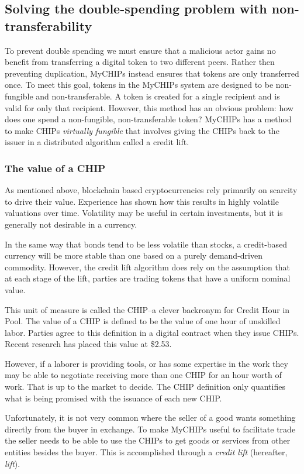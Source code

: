 \documentclass[runningheads]{llncs}
\begin{document}
\subsection{Solving the double-spending problem with non-transferability}
To prevent double spending we must ensure that a malicious actor gains no benefit from transferring a digital token to two different peers. Rather then preventing duplication, MyCHIPs instead ensures that tokens are only transferred once. To meet this goal, tokens in the MyCHIPs system are designed to be non-fungible and non-transferable. A token is created for a single recipient and is valid for only that recipient. However, this method has an obvious problem: how does one spend a non-fungible, non-transferable token? MyCHIPs has a method to make CHIPs \emph{virtually fungible} that involves giving the CHIPs back to the issuer in a distributed algorithm called a credit lift.  \cite{bateman_myCHIPs}


\subsubsection{The value of a CHIP}
As mentioned above, blockchain based cryptocurrencies rely primarily on scarcity to drive their value.
Experience has shown how this results in highly volatile valuations over time.
Volatility may be useful in certain investments, but it is generally not desirable in a currency.

In the same way that bonds tend to be less volatile than stocks, a credit-based currency will be more stable than one based on a purely demand-driven commodity.
However, the credit lift algorithm does rely on the assumption that at each stage of the lift, parties are trading tokens that have a uniform nominal value.

This unit of measure is called the CHIP--a clever backronym for Credit Hour in Pool.
The value of a CHIP is defined to be the value of one hour of unskilled labor. Parties agree to this definition in a digital contract when they issue CHIPs. Recent research has placed this value at \$2.53. \cite{bateman_chip_value}

However, if a laborer is providing tools, or has some expertise in the work they may be able to negotiate receiving more than one CHIP for an hour worth of work.
That is up to the market to decide.
The CHIP definition only quantifies what is being promised with the issuance of each new CHIP.

Unfortunately, it is not very common where the seller of a good wants something directly from the buyer in exchange. To make MyCHIPs useful to facilitate trade the seller needs to be able to use the CHIPs to get goods or services from other entities besides the buyer. This is accomplished through a \emph{credit lift} (hereafter, \emph{lift}).
\end{document}

